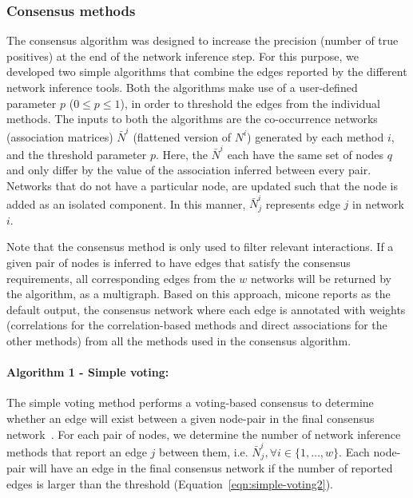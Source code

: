 \documentclass[letterpaper,12pt]{article}
\begin{document}
  \subsubsection*{Consensus methods}
  \vspace{-5mm}
  The consensus algorithm was designed to increase the precision (number of true positives) at the end of the network inference step.
  For this purpose, we developed two simple algorithms that combine the edges reported by the different network inference tools.
  Both the algorithms make use of a user-defined parameter $p$ ($0 \leq p \leq 1$), in order to threshold the edges from the individual methods.
  The inputs to both the algorithms are the co-occurrence networks (association matrices) $\bar{N}^i$ (flattened version of $N^{i}$) generated by each method $i$, and the threshold parameter $p$.
  Here, the $\bar{N}^{i}$ each have the same set of nodes $q$ and only differ by the value of the association inferred between every pair.
  Networks that do not have a particular node, are updated such that the node is added as an isolated component.
  In this manner, $\bar{N}^{i}_j$ represents edge $j$ in network $i$.

    Note that the consensus method is only used to filter relevant interactions.
    If a given pair of nodes is inferred to have edges that satisfy the consensus requirements, all corresponding edges from the $w$ networks will be returned by the algorithm, as a multigraph.
    Based on this approach, \ac{micone} reports as the default output, the consensus network where each edge is annotated with weights (correlations for the correlation-based methods and direct associations for the other methods) from all the methods used in the consensus algorithm.

  \paragraph*{Algorithm 1 - Simple voting:}
  The simple voting method performs a voting-based consensus to determine whether an edge will exist between a given node-pair in the final consensus network~\cite{bustinceFuzzySetsTheir2008,tsarevApplicationMajorityVoting2018}.
  For each pair of nodes, we determine the number of network inference methods that report an edge $j$ between them, i.e. $\bar{N}^{i}_{j}, \forall i \in \{1,\dots,w\}$.
  Each node-pair will have an edge in the final consensus network if the number of reported edges is larger than the threshold (Equation~\ref{eqn:simple-voting2}).
\end{document}
